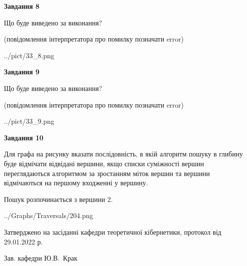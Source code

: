 \documentclass[12pt, ukrainian]{article}
\begin{document}
{\begin {large}
{\begin {center}\textbf{Завдання 8}\end {center}}\par
Що буде виведено за виконання?\par
 (повідомлення інтерпретатора про помилку позначати error)\par
\begin{center}
	{../pict/33_8.png}
\end{center}
\newpage

{\begin {center}\textbf{Завдання 9}\end {center}}\par
Що буде виведено за виконання?\par
 (повідомлення інтерпретатора про помилку позначати error)\par
\begin{center}
	{../pict/33_9.png}
\end{center}
\newpage

{\begin {center}\textbf{Завдання 10}\end {center}}\par
Для графа на рисунку вказати послідовність, в якій алгоритм пошуку в глибину буде відмічати відвідані вершини, якщо списки суміжності вершин переглядаються алгоритмом за зростанням міток вершин та вершини відмічаються на першому вход\-женні у вершину.\par
Пошук розпочинається з вершини 2.\par

\begin{center}
	{../Graphs/Traversals/204.png}
\end{center}\par
\newpage


\end {large}
}
{\smallskip \begin {small} Затверджено на засіданні кафедри теоретичної кібернетики, протокол  від   29.01.2022 р.\par\smallskip\smallskip
{\parbox {6.5 cm}{Зав. кафедри \dotfill Ю.В.~Крак}} \end{small}}
\end{document}
